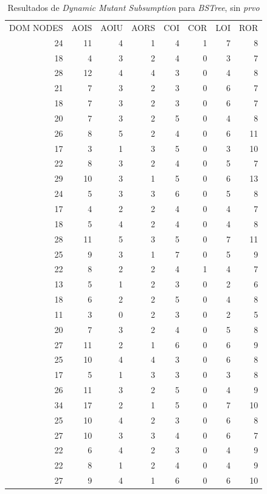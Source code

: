 \begin{table}[]
	\caption{Resultados de \emph{Dynamic Mutant Subsumption} para \emph{BSTree}, sin \emph{prvo}}
	\label{tables.results.subsumption.bstree.noprvo}
	\centering
	\scriptsize
	\def\arraystretch{0.95}
	\setlength\tabcolsep{0.5mm}
	\begin{tabular}{rrrrrrrr}
	DOM NODES & AOIS & AOIU & AORS & COI & COR & LOI & ROR \\
	24 & 11 & 4 & 1 & 4 & 1 & 7 & 8 \\
	18 & 4 & 3 & 2 & 4 & 0 & 3 & 7 \\
	28 & 12 & 4 & 4 & 3 & 0 & 4 & 8 \\
	21 & 7 & 3 & 2 & 3 & 0 & 6 & 7 \\
	18 & 7 & 3 & 2 & 3 & 0 & 6 & 7 \\
	20 & 7 & 3 & 2 & 5 & 0 & 4 & 8 \\
	26 & 8 & 5 & 2 & 4 & 0 & 6 & 11 \\
	17 & 3 & 1 & 3 & 5 & 0 & 3 & 10 \\
	22 & 8 & 3 & 2 & 4 & 0 & 5 & 7 \\
	29 & 10 & 3 & 1 & 5 & 0 & 6 & 13 \\
	24 & 5 & 3 & 3 & 6 & 0 & 5 & 8 \\
	17 & 4 & 2 & 2 & 4 & 0 & 4 & 7 \\
	18 & 5 & 4 & 2 & 4 & 0 & 4 & 8 \\
	28 & 11 & 5 & 3 & 5 & 0 & 7 & 11 \\
	25 & 9 & 3 & 1 & 7 & 0 & 5 & 9 \\
	22 & 8 & 2 & 2 & 4 & 1 & 4 & 7 \\
	13 & 5 & 1 & 2 & 3 & 0 & 2 & 6 \\
	18 & 6 & 2 & 2 & 5 & 0 & 4 & 8 \\
	11 & 3 & 0 & 2 & 3 & 0 & 2 & 5 \\
	20 & 7 & 3 & 2 & 4 & 0 & 5 & 8 \\
	27 & 11 & 2 & 1 & 6 & 0 & 6 & 9 \\
	25 & 10 & 4 & 4 & 3 & 0 & 6 & 8 \\
	17 & 5 & 1 & 3 & 3 & 0 & 3 & 8 \\
	26 & 11 & 3 & 2 & 5 & 0 & 4 & 9 \\
	34 & 17 & 2 & 1 & 5 & 0 & 7 & 10 \\
	25 & 10 & 4 & 2 & 3 & 0 & 6 & 8 \\
	27 & 10 & 3 & 3 & 4 & 0 & 6 & 7 \\
	22 & 6 & 4 & 2 & 3 & 0 & 4 & 9 \\
	22 & 8 & 1 & 2 & 4 & 0 & 4 & 9 \\
	27 & 9 & 4 & 1 & 6 & 0 & 6 & 10
	\end{tabular}
\end{table}

